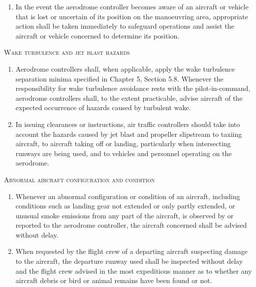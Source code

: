 \begin{enumeratesc}
\begin{enumerate}
        \item In the event the aerodrome controller becomes aware of an aircraft or vehicle that is lost or uncertain of its position on the manoeuvring area, appropriate action shall be taken immediately to safeguard operations and assist the aircraft or vehicle concerned to determine its position.
    \end{enumerate}

    \item \textsc{Wake turbulence and jet blast hazards}
    \begin{enumerate}
        \item Aerodrome controllers shall, when applicable, apply the wake turbulence separation minima specified in Chapter 5, Section 5.8. Whenever the responsibility for wake turbulence avoidance rests with the pilot-in-command, aerodrome controllers shall, to the extent practicable, advise aircraft of the expected occurrence of hazards caused by turbulent wake.
        \item In issuing clearances or instructions, air traffic controllers should take into account the hazards caused by jet blast and propeller slipstream to taxiing aircraft, to aircraft taking off or landing, particularly when intersecting runways are being used, and to vehicles and personnel operating on the aerodrome.
    \end{enumerate}

    \item \textsc{Abnormal aircraft configuration and condition}
    \begin{enumerate}
        \item Whenever an abnormal configuration or condition of an aircraft, including conditions such as landing gear not extended or only partly extended, or unusual smoke emissions from any part of the aircraft, is observed by or reported to the aerodrome controller, the aircraft concerned shall be advised without delay.
        \item When requested by the flight crew of a departing aircraft suspecting damage to the aircraft, the departure runway used shall be inspected without delay and the flight crew advised in the most expeditious manner as to whether any aircraft debris or bird or animal remains have been found or not.
    \end{enumerate}
\end{enumeratesc}

